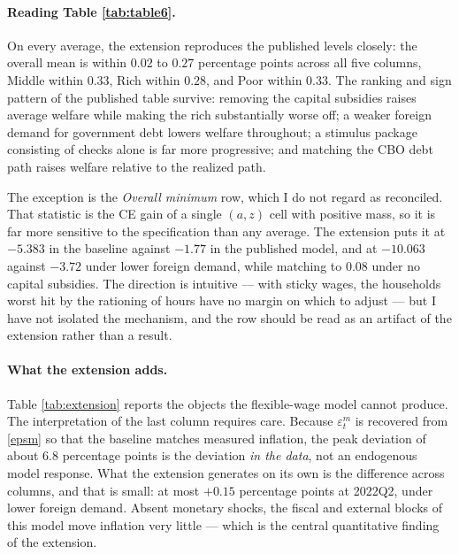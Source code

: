 \paragraph{Reading Table \ref{tab:table6}.} On every average, the extension
reproduces the published levels closely: the overall mean is within $0.02$ to
$0.27$ percentage points across all five columns, Middle within $0.33$, Rich
within $0.28$, and Poor within $0.33$. The ranking and sign pattern of the
published table survive: removing the capital subsidies raises average welfare
while making the rich substantially worse off; a weaker foreign demand for
government debt lowers welfare throughout; a stimulus package consisting of
checks alone is far more progressive; and matching the CBO debt path raises
welfare relative to the realized path.

The exception is the \textit{Overall minimum} row, which I do not regard as
reconciled. That statistic is the CE gain of a single $(a,z)$ cell with positive
mass, so it is far more sensitive to the specification than any average. The
extension puts it at $-5.383$ in the baseline against $-1.77$ in the published
model, and at $-10.063$ against $-3.72$ under lower foreign demand, while
matching to $0.08$ under no capital subsidies. The direction is intuitive
--- with sticky wages, the households worst hit by the rationing of hours have no
margin on which to adjust --- but I have not isolated the mechanism, and the row
should be read as an artifact of the extension rather than a result.

\paragraph{What the extension adds.} Table \ref{tab:extension} reports the
objects the flexible-wage model cannot produce. The interpretation of the last
column requires care. Because $\varepsilon^m_t$ is recovered from \eqref{epsm}
so that the baseline matches measured inflation, the peak deviation of about
$6.8$ percentage points is the deviation \emph{in the data}, not an endogenous
model response. What the extension generates on its own is the difference across
columns, and that is small: at most $+0.15$ percentage points at 2022Q2, under
lower foreign demand. Absent monetary shocks, the fiscal and external blocks of
this model move inflation very little --- which is the central quantitative
finding of the extension.

